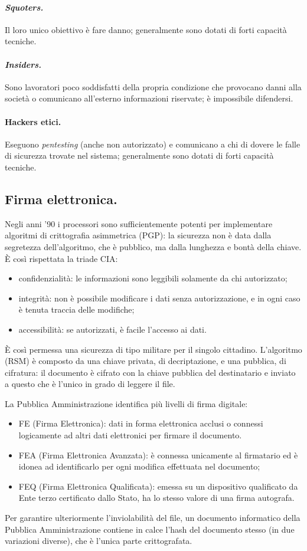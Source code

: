 \documentclass[a4page, 11pt, twocolumn]{article}
\begin{document}
\paragraph{\textit{Squoters.}} Il loro unico obiettivo è fare danno; generalmente sono dotati di forti capacità tecniche.
\paragraph{\textit{Insiders.}} Sono lavoratori poco soddisfatti della propria condizione che provocano danni alla società o comunicano all'esterno informazioni riservate; è impossibile difendersi.
\paragraph{Hackers etici.} Eseguono \textit{pentesting} (anche non autorizzato) e comunicano a chi di dovere le falle di sicurezza trovate nel sistema; generalmente sono dotati di forti capacità tecniche.

\subsection{Firma elettronica.}
Negli anni '90 i processori sono sufficientemente potenti per implementare algoritmi di crittografia asimmetrica (PGP): la sicurezza non è data dalla segretezza dell'algoritmo, che è pubblico, ma dalla lunghezza e bontà della chiave.
È così rispettata la triade CIA:
\begin{itemize}
\item confidenzialità: le informazioni sono leggibili solamente da chi autorizzato;
\item integrità: non è possibile modificare i dati senza autorizzazione, e in ogni caso è tenuta traccia delle modifiche;
\item accessibilità: se autorizzati, è facile l'accesso ai dati.
\end{itemize}
È così permessa una sicurezza di tipo militare per il singolo cittadino.
L'algoritmo (RSM) è composto da una chiave privata, di decriptazione, e una pubblica, di cifratura: il documento è cifrato con la chiave pubblica del destinatario e inviato a questo che è l'unico in grado di leggere il file.

La Pubblica Amministrazione identifica più livelli di firma digitale:
\begin{itemize}
\item FE (Firma Elettronica): dati in forma elettronica acclusi o connessi logicamente ad altri dati elettronici per firmare il documento.
\item FEA (Firma Elettronica Avanzata): è connessa unicamente al firmatario ed è idonea ad identificarlo per ogni modifica effettuata nel documento;
\item FEQ (Firma Elettronica Qualificata): emessa su un dispositivo qualificato da Ente terzo certificato dallo Stato, ha lo stesso valore di una firma autografa.
\end{itemize}
Per garantire ulteriormente l'inviolabilità del file, un documento informatico della Pubblica Amministrazione contiene in calce l'hash del documento stesso (in due variazioni diverse), che è l'unica parte crittografata.
\end{document}
